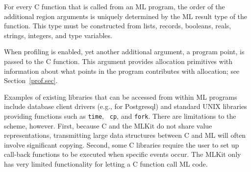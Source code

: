 \documentclass[12pt]{book}
\begin{document}
For every C function that is called from an ML program, the order of the
additional region arguments is uniquely determined by the ML result type
of the function.  This type must be constructed from lists, records,
booleans, reals, strings, integers, and type variables.

When profiling is enabled, yet another additional argument, a program
point, is passed to the C function. This argument provides allocation
primitives with information about what points in the program
contributes with allocation; see Section~\ref{prof.sec}.

Examples of existing libraries that can be accessed from within ML
programs include database client drivers (e.g., for Postgresql) and
standard UNIX libraries providing functions such as {\tt time}, {\tt
  cp}, and {\tt fork}. There are limitations to the scheme,
however. First, because C and the MLKit do not share value
representations, transmitting large data structures between C and ML
will often involve significant copying. Second, some C libraries
require the user to set up
%
%
%
call-back functions to be executed when specific events occur. The
MLKit only has very limited functionality for letting a C function
call ML code.

\end{document}
